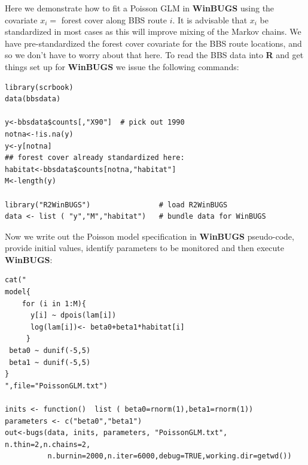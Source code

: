 Here we demonstrate how to fit a Poisson GLM in {\bf WinBUGS} using the
covariate $x_{i} =$ forest cover along BBS route $i$. It is advisable that $x_i$ be
standardized in most cases as this will improve mixing of the Markov
chains. We have pre-standardized the forest cover covariate for the
BBS route locations,
 and so we don't have to worry about that
here.  To read the BBS data into {\bf R} and get things set up for
{\bf WinBUGS}
we issue the following commands:
{\small
\begin{verbatim}
library(scrbook)
data(bbsdata)

y<-bbsdata$counts[,"X90"]  # pick out 1990
notna<-!is.na(y)
y<-y[notna]
## forest cover already standardized here:
habitat<-bbsdata$counts[notna,"habitat"]
M<-length(y)

library("R2WinBUGS")                # load R2WinBUGS
data <- list ( "y","M","habitat")   # bundle data for WinBUGS
\end{verbatim}
}
Now we write out the Poisson model specification in {\bf WinBUGS}
pseudo-code, provide initial values, identify parameters to be
monitored and then execute {\bf WinBUGS}:
{\small
\begin{verbatim}
cat("
model{
    for (i in 1:M){
      y[i] ~ dpois(lam[i])
      log(lam[i])<- beta0+beta1*habitat[i]
     }
 beta0 ~ dunif(-5,5)
 beta1 ~ dunif(-5,5)
}
",file="PoissonGLM.txt")

inits <- function()  list ( beta0=rnorm(1),beta1=rnorm(1))
parameters <- c("beta0","beta1")
out<-bugs(data, inits, parameters, "PoissonGLM.txt", n.thin=2,n.chains=2,
          n.burnin=2000,n.iter=6000,debug=TRUE,working.dir=getwd())
\end{verbatim}
}


